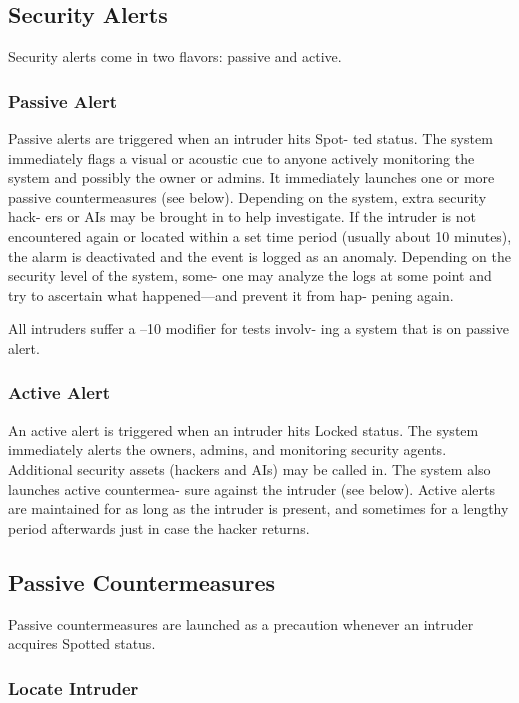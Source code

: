 \subsection{Security Alerts}

Security alerts come in two flavors: passive and active.

\subsubsection{Passive Alert}

Passive alerts are triggered when an intruder hits Spot-
ted status. The system immediately flags a visual or 
acoustic cue to anyone actively monitoring the system 
and possibly the owner or admins. It immediately 
launches one or more passive countermeasures (see 
below). Depending on the system, extra security hack-
ers or AIs may be brought in to help investigate. If the 
intruder is not encountered again or located within a 
set time period (usually about 10 minutes), the alarm 
is deactivated and the event is logged as an anomaly. 
Depending on the security level of the system, some-
one may analyze the logs at some point and try to 
ascertain what happened—and prevent it from hap-
pening again.

All intruders suffer a –10 modifier for tests involv-
ing a system that is on passive alert.

\subsubsection{Active Alert}

An active alert is triggered when an intruder hits 
Locked status. The system immediately alerts the 
owners, admins, and monitoring security agents. 
Additional security assets (hackers and AIs) may be 
called in. The system also launches active countermea-
sure against the intruder (see below). Active alerts are 
maintained for as long as the intruder is present, and 
sometimes for a lengthy period afterwards just in case 
the hacker returns.

\subsection{Passive Countermeasures}

Passive countermeasures are launched as a precaution 
whenever an intruder acquires Spotted status.

\subsubsection{Locate Intruder}

